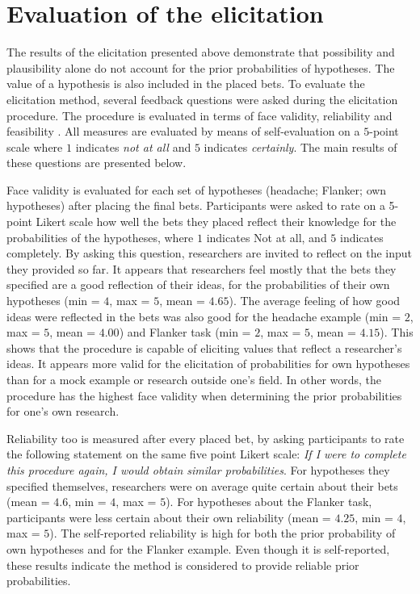 \documentclass[man]{apa6}
\begin{document}
\section{Evaluation of the elicitation}
The results of the elicitation presented above demonstrate that possibility and plausibility alone do not account for the prior probabilities of hypotheses.
The value of a hypothesis is also included in the placed bets.
To evaluate the elicitation method, several feedback questions were asked during the elicitation procedure.
The procedure is evaluated in terms of face validity, reliability and feasibility \cite{johnson10a}.
All measures are evaluated by means of self-evaluation on a $5$-point scale where $1$ indicates \textit{not at all} and $5$ indicates \textit{certainly}.
The main results of these questions are presented below.

Face validity is evaluated for each set of hypotheses (headache; Flanker; own hypotheses) after placing the final bets.
Participants were asked to rate on a 5-point Likert scale how well the bets they placed reflect their knowledge for the probabilities of the hypotheses, where $1$ indicates Not at all, and $5$ indicates completely.
By asking this question, researchers are invited to reflect on the input they provided so far.
It appears that researchers feel mostly that the bets they specified are a good reflection of their ideas, for the probabilities of their own hypotheses (min = $4$, max = $5$, mean = $4.65$).
The average feeling of how good ideas were reflected in the bets was also good for the headache example (min = $2$, max = $5$, mean = $4.00$) and Flanker task (min = $2$, max = $5$, mean = $4.15$).
This shows that the procedure is capable of eliciting values that reflect a researcher's ideas.
It appears more valid for the elicitation of probabilities for own hypotheses than for a mock example or research outside one's field.
In other words, the procedure has the highest face validity when determining the prior probabilities for one's own research.

Reliability too is measured after every placed bet, by asking participants to rate the following statement on the same five point Likert scale: \textit{If I were to complete this procedure again, I would obtain similar probabilities}.
For hypotheses they specified themselves, researchers were on average quite certain about their bets (mean = $4.6$, min = $4$, max = $5$).
For hypotheses about the Flanker task, participants were less certain about their own reliability (mean = $4.25$, min = $4$, max = $5$).
The self-reported reliability is high for both the prior probability of own hypotheses and for the Flanker example.
Even though it is self-reported, these results indicate the method is considered to provide reliable prior probabilities.
\end{document}
